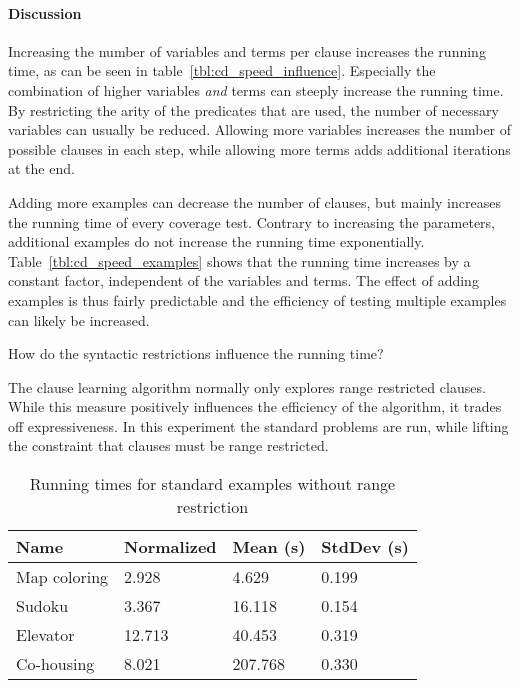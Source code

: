 \paragraph{Discussion}
Increasing the number of variables and terms per clause increases the running time, as can be seen in table~\ref{tbl:cd_speed_influence}.
Especially the combination of higher variables \emph{and} terms can steeply increase the running time.
By restricting the arity of the predicates that are used, the number of necessary variables can usually be reduced.
Allowing more variables increases the number of possible clauses in each step, while allowing more terms adds additional iterations at the end.

Adding more examples can decrease the number of clauses, but mainly increases the running time of every coverage test.
Contrary to increasing the parameters, additional examples do not increase the running time exponentially.
Table~\ref{tbl:cd_speed_examples} shows that the running time increases by a constant factor, independent of the variables and terms.
The effect of adding examples is thus fairly predictable and the efficiency of testing multiple examples can likely be increased.

\begin{question}
	How do the syntactic restrictions influence the running time?
\end{question}

\begin{experiment}
	The clause learning algorithm normally only explores range restricted clauses.
	While this measure positively influences the efficiency of the algorithm, it trades off expressiveness.
	In this experiment the standard problems are run, while lifting the constraint that clauses must be range restricted.

	\begin{table}[!htp]
		\begin{tabularx}{\textwidth}{XXXX}
			\textbf{Name} 	& \textbf{Normalized}	& \textbf{Mean (s)}	& \textbf{StdDev (s)} \\
			\toprule
			Map coloring 	& 2.928					& 4.629				& 0.199 \\
			Sudoku 			& 3.367					& 16.118			& 0.154 \\
			Elevator 		& 12.713				& 40.453 			& 0.319 \\
			Co-housing 		& 8.021					& 207.768			& 0.330
		\end{tabularx}
		\label{tbl:exp_speed_no_range}
		\caption{Running times for standard examples without range restriction}
	\end{table}

\end{experiment}


